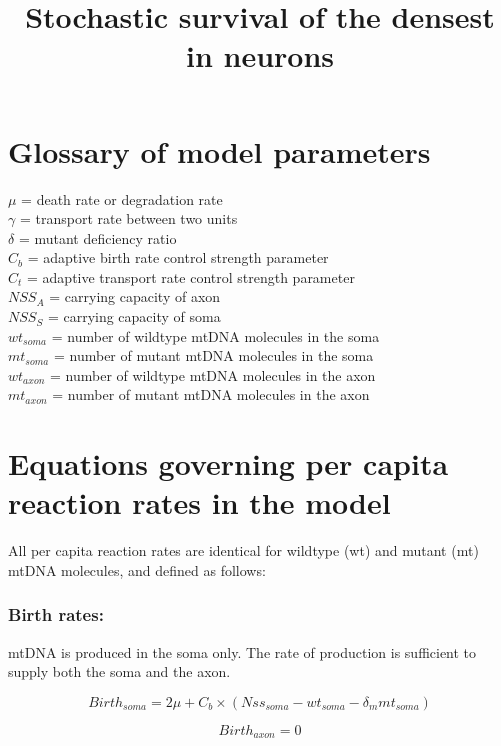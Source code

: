 \documentclass[]{article}
\title{Stochastic survival of the densest in neurons}
\author{}
\begin{document}
\maketitle
	

\section{Glossary of model parameters}

	$\mu$ = death rate or degradation rate \\
	$\gamma$ = transport rate between two units \\
	$\delta$ = mutant deficiency ratio \\
	$C_b$ = adaptive birth rate control strength parameter \\
	$C_t$ = adaptive transport rate control strength parameter \\
	$NSS_A$ = carrying capacity of axon \\
	$NSS_S$ = carrying capacity of soma \\
	$wt_{soma}$ = number of wildtype mtDNA molecules in the soma \\
	$mt_{soma}$ = number of mutant mtDNA molecules in the soma \\
	$wt_{axon}$ = number of wildtype mtDNA molecules in the axon \\
	$mt_{axon}$ = number of mutant mtDNA molecules in the axon \\
	
\section{Equations governing per capita reaction rates in the model}
	
	All per capita reaction rates are identical for wildtype (wt) and mutant (mt) mtDNA molecules, and defined as follows:

	\subsubsection{Birth rates:}
	
	mtDNA is produced in the soma only. The rate of production is sufficient to supply both the soma and the axon.

	\begin{equation}
		Birth_{soma} = 2\mu + C_b \times (Nss_{soma}-wt_{soma}-\delta_m mt_{soma}) 
	\end{equation}
	
	\begin{equation}
		Birth_{axon} = 0
	\end{equation}
	
\end{document}
